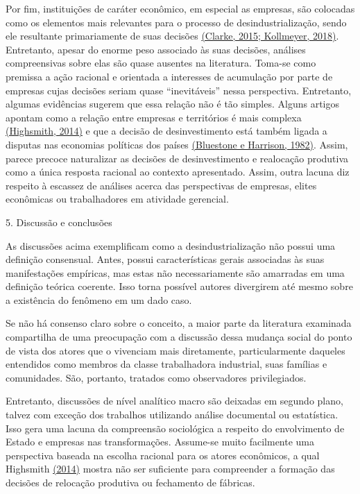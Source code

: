 Por fim, instituições de caráter econômico, em especial as empresas, são
colocadas como os elementos mais relevantes para o processo de
desindustrialização, sendo ele resultante primariamente de suas decisões
\href{https://www.zotero.org/google-docs/?9Cf4QP}{(Clarke, 2015;
Kollmeyer, 2018)}. Entretanto, apesar do enorme peso associado às suas
decisões, análises compreensivas sobre elas são quase ausentes na
literatura. Toma-se como premissa a ação racional e orientada a
interesses de acumulação por parte de empresas cujas decisões seriam
quase ``inevitáveis'' nessa perspectiva. Entretanto, algumas evidências
sugerem que essa relação não é tão simples. Alguns artigos apontam como
a relação entre empresas e territórios é mais complexa
\href{https://www.zotero.org/google-docs/?O7AVby}{(Highsmith, 2014)} e
que a decisão de desinvestimento está também ligada a disputas nas
economias políticas dos países
\href{https://www.zotero.org/google-docs/?bL2vpv}{(Bluestone e Harrison,
1982)}. Assim, parece precoce naturalizar as decisões de desinvestimento
e realocação produtiva como a única resposta racional ao contexto
apresentado. Assim, outra lacuna diz respeito à escassez de análises
acerca das perspectivas de empresas, elites econômicas ou trabalhadores
em atividade gerencial.

5. Discussão e conclusões

As discussões acima exemplificam como a desindustrialização não possui
uma definição consensual. Antes, possui características gerais
associadas às suas manifestações empíricas, mas estas não
necessariamente são amarradas em uma definição teórica coerente. Isso
torna possível autores divergirem até mesmo sobre a existência do
fenômeno em um dado caso.

Se não há consenso claro sobre o conceito, a maior parte da literatura
examinada compartilha de uma preocupação com a discussão dessa mudança
social do ponto de vista dos atores que o vivenciam mais diretamente,
particularmente daqueles entendidos como membros da classe trabalhadora
industrial, suas famílias e comunidades. São, portanto, tratados como
observadores privilegiados.

Entretanto, discussões de nível analítico macro são deixadas em segundo
plano, talvez com exceção dos trabalhos utilizando análise documental ou
estatística. Isso gera uma lacuna da compreensão sociológica a respeito
do envolvimento de Estado e empresas nas transformações. Assume-se muito
facilmente uma perspectiva baseada na escolha racional para os atores
econômicos, a qual Highsmith
\href{https://www.zotero.org/google-docs/?UHzgwr}{(2014)} mostra não ser
suficiente para compreender a formação das decisões de relocação
produtiva ou fechamento de fábricas.

